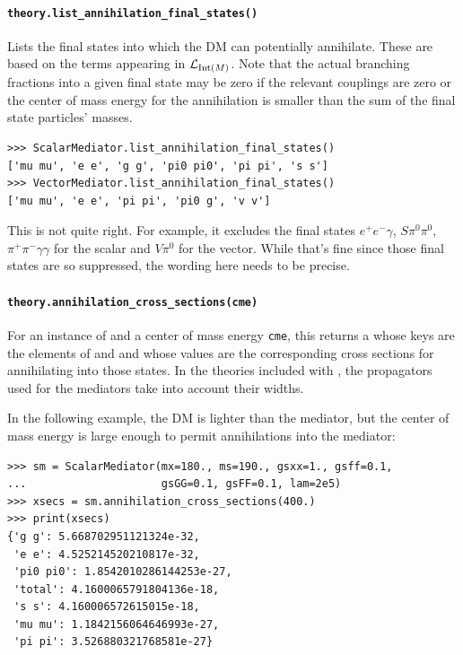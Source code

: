 \paragraph{\texttt{theory.list\_annihilation\_final\_states()}} Lists the final states into which the DM can potentially annihilate. These are based on the terms appearing in $\mathcal{L}_{{\mathrm{Int}}(M)}$. Note that the actual branching fractions into a given final state may be zero if the relevant couplings are zero or the center of mass energy for the annihilation is smaller than the sum of the final state particles' masses. 
\begin{verbatim}
>>> ScalarMediator.list_annihilation_final_states()
['mu mu', 'e e', 'g g', 'pi0 pi0', 'pi pi', 's s']
>>> VectorMediator.list_annihilation_final_states()
['mu mu', 'e e', 'pi pi', 'pi0 g', 'v v']
\end{verbatim}
{\color{red} This is not quite right. For example, it excludes the final states $e^+ e^- \gamma$, $S \pi^0 \pi^0$, $\pi^+ \pi^- \gamma \gamma$ for the scalar and $V \pi^0$ for the vector. While that's fine since those final states are so suppressed, the wording here needs to be precise.}

\paragraph{\texttt{theory.annihilation\_cross\_sections(cme)}} For an instance  of  and a center of mass energy \texttt{cme}, this returns a  whose keys are the elements of  and  and whose values are the corresponding cross sections for annihilating into those states. In the theories included with \hazma, the propagators used for the mediators take into account their widths.

In the following example, the DM is lighter than the mediator, but the center of mass energy is large enough to permit annihilations into the mediator:
\begin{verbatim}
>>> sm = ScalarMediator(mx=180., ms=190., gsxx=1., gsff=0.1,
...                     gsGG=0.1, gsFF=0.1, lam=2e5)
>>> xsecs = sm.annihilation_cross_sections(400.)
>>> print(xsecs)
{'g g': 5.668702951121324e-32,
 'e e': 4.525214520210817e-32,
 'pi0 pi0': 1.8542010286144253e-27,
 'total': 4.1600065791804136e-18,
 's s': 4.160006572615015e-18,
 'mu mu': 1.1842156064646993e-27,
 'pi pi': 3.526880321768581e-27}
\end{verbatim}


